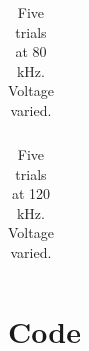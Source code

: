 \documentclass[12pt]{report}
\begin{document}
	\begin{table}
		\centering
		\begin{tabular}{|l|l|l|l|l|l|l|l|l|l|l|l|}
			\hline
			 
		\end{tabular}
		\label{tab:chaos2}
		\caption{Five trials at 80 kHz. Voltage varied.}
	\end{table}
	
	\begin{table}
		\centering
		\begin{tabular}{|l|l|l|l|l|l|l|l|l|l|l|l|}
			\hline
			 
		\end{tabular}
		\label{tab:chaos2}
		\caption{Five trials at 120 kHz. Voltage varied.}
	\end{table}

\section{Code}
\label{sec: Code}

	
\end{document}
